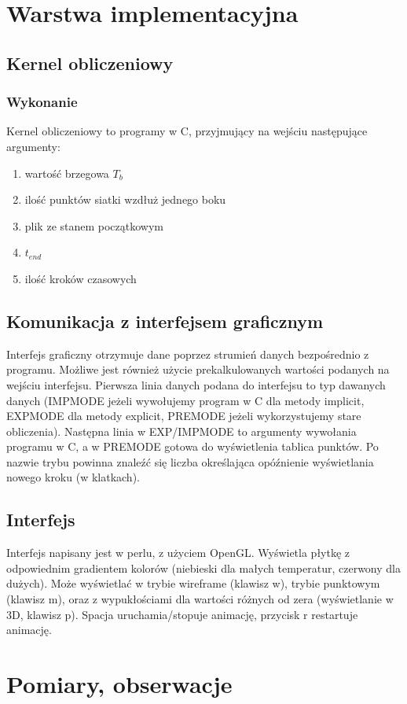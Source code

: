\documentclass{article}
\begin{document}
\section{Warstwa implementacyjna}
\subsection{Kernel obliczeniowy}
\subsubsection{Wykonanie}
Kernel obliczeniowy to programy w C, przyjmujący na wejściu następujące argumenty:
\begin{enumerate}
   \item wartość brzegowa $T_b$
   \item ilość punktów siatki wzdłuż jednego boku
   \item plik ze stanem początkowym
   \item $t_{end}$
   \item ilość kroków czasowych
\end{enumerate}

\subsection{Komunikacja z interfejsem graficznym}
Interfejs graficzny otrzymuje dane poprzez strumień danych bezpośrednio z programu.
Możliwe jest również użycie prekalkulowanych wartości podanych na wejściu interfejsu.
Pierwsza linia danych podana do interfejsu to typ dawanych danych (IMPMODE jeżeli wywołujemy
program w C dla metody implicit, EXPMODE dla metody explicit, PREMODE jeżeli wykorzystujemy stare obliczenia). 
Następna linia w EXP/IMPMODE to argumenty wywołania
programu w C, a w PREMODE gotowa do wyświetlenia tablica punktów.
Po nazwie trybu powinna znaleźć się liczba określająca opóźnienie wyświetlania nowego kroku (w klatkach).
\subsection{Interfejs}
Interfejs napisany jest w perlu, z użyciem OpenGL. Wyświetla płytkę z odpowiednim gradientem kolorów (niebieski
dla małych temperatur, czerwony dla dużych). Może wyświetlać w trybie wireframe (klawisz w),
trybie punktowym (klawisz m), oraz z wypukłościami dla wartości różnych od zera (wyświetlanie w 3D, klawisz p).
Spacja uruchamia/stopuje animację, przycisk r restartuje animację.
\section{Pomiary, obserwacje}
\end{document}
